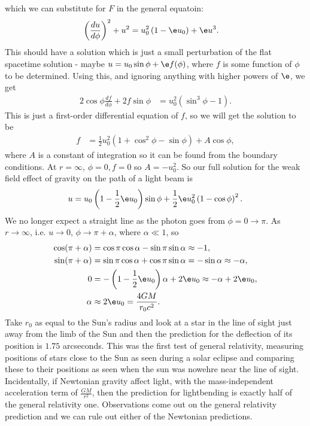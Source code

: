 \documentclass[a4paper, 11pt, normalem]{report}
\begin{document}
which we can substitute for $F$ in the general equatoin:
\begin{align}
    \left(\frac{du}{d\phi}\right)^2 + u^2 &= u_0^2\left(1-\e u_0\right) + \e u^3.
\end{align}
This should have a solution which is just a small perturbation of the flat spacetime solution - maybe $u=u_0\sin\phi+\e f(\phi)$, where $f$ is some function of $\phi$ to be determined. 
Using this, and ignoring anything with higher powers of $\e$, we get
\begin{align}
    2\cos\phi\frac{df}{d\phi} + 2f\sin\phi &= u_0^2(\sin^3\phi-1).
\end{align}
This is just a first-order differential equation of $f$, so we will get the solution to be
\begin{align}
    f &= \frac12u_0^2\left(1+\cos^2\phi-\sin\phi\right) + A\cos\phi,
\end{align}
where $A$ is a constant of integration so it can be found from the boundary conditions. 
At $r=\infty$, $\phi=0,f=0$ so $A=-u_0^2$.
So our full solution for the weak field effect of gravity on the path of a light beam is
\begin{align}
    u = u_0\left(1-\frac12\e u_0\right)\sin\phi + \frac12\e u_0^2\left(1-\cos\phi\right)^2.
\end{align}
We no longer expect a straight line as the photon goes from $\phi=0\to\pi$.
As $r\to\infty$, i.e. $u\to0$, $\phi\to\pi+\alpha$, where $\alpha\ll1$, so
\begin{align}
    \cos(\pi+\alpha) &= \cos\pi\cos\alpha - \sin\pi\sin\alpha \approx -1, \\
    \sin(\pi+\alpha) &= \sin\pi\cos\alpha + \cos\pi\sin\alpha = -\sin\alpha \approx -\alpha, \\
    0 &= -\left(1-\frac12\e u_0\right)\alpha + 2\e u_0 \approx -\alpha+2\e u_0, \\
    \alpha &\approx 2\e u_0 = \frac{4GM}{r_0c^2}. 
\end{align}
Take $r_0$ as equal to the Sun's radius and look at a star in the line of sight just away from the limb of the Sun and then the prediction for the deflection of its position is $1.75$ arcseconds. 
This was the first test of general relativity, measuring positions of stars close to the Sun as seen during a solar eclipse and comparing these to their positions as seen when the sun was nowehre near the line of sight. 
Incidentally, if Newtonian gravity  affect light, with the mass-independent acceleration term of $\frac{GM}{r^2}$, then the prediction for lightbending is exactly half of the general relativity one. 
Observations come out on the general relativity prediction and we can rule out either of the Newtonian predictions. 
\end{document}
